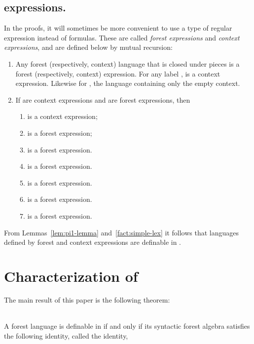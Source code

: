 \documentclass{LMCS}
\begin{document}
\subsection{\texorpdfstring{}{Sigma2} expressions.}
In the proofs, it will sometimes be more convenient to use a type of regular expression instead of formulas. These are called  \emph{ forest expressions} and \emph{ context
  expressions}, and are defined below by mutual recursion:
  \begin{enumerate}[]
  \item Any forest (respectively, context) language that is closed
    under pieces is a  forest (respectively, context)
    expression.  For any label ,  is a
     context expression. Likewise for , the language containing only the empty context.
\item If  are  context expressions and  are
   forest expressions, then
  \begin{enumerate}[]
  \item  is a  context expression;
\item  is a  forest expression;
\item  is a  forest expression.
\item  is a  forest expression. 
\item  is a  forest expression. 
\item  is a  forest expression. 
\item  is a  forest expression. 
  \end{enumerate}
  \end{enumerate}
From Lemmas~\ref{lem:pi1-lemma} and~\ref{fact:simple-lex}  it follows that languages defined by   forest
and context expressions are definable in \Stwol.



\section{Characterization of \texorpdfstring{\Dtwol}{Dtwol}}
\label{sec:char-inter}
The main result of this paper is the following theorem:

\begin{thm}\label{thm:main}\ \vspace{-0.3cm} \\ 
 A forest language is definable in \Dtwol if and only if its syntactic
  forest algebra satisfies the following  identity, called the
   identity,
  
\end{thm}
\end{document}
